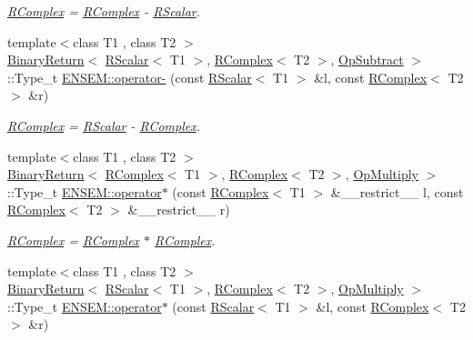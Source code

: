 \begin{DoxyCompactItemize}
\begin{DoxyCompactList}\small\item\em \mbox{\hyperlink{classENSEM_1_1RComplex}{R\+Complex}} = \mbox{\hyperlink{classENSEM_1_1RComplex}{R\+Complex}} -\/ \mbox{\hyperlink{classENSEM_1_1RScalar}{R\+Scalar}}. \end{DoxyCompactList}\item 
{\footnotesize template$<$class T1 , class T2 $>$ }\\\mbox{\hyperlink{structENSEM_1_1BinaryReturn}{Binary\+Return}}$<$ \mbox{\hyperlink{classENSEM_1_1RScalar}{R\+Scalar}}$<$ T1 $>$, \mbox{\hyperlink{classENSEM_1_1RComplex}{R\+Complex}}$<$ T2 $>$, \mbox{\hyperlink{structENSEM_1_1OpSubtract}{Op\+Subtract}} $>$\+::Type\+\_\+t \mbox{\hyperlink{group__rcomplex_ga92f922f58ca43c5692f794ecb95dc1f5}{E\+N\+S\+E\+M\+::operator-\/}} (const \mbox{\hyperlink{classENSEM_1_1RScalar}{R\+Scalar}}$<$ T1 $>$ \&l, const \mbox{\hyperlink{classENSEM_1_1RComplex}{R\+Complex}}$<$ T2 $>$ \&r)
\begin{DoxyCompactList}\small\item\em \mbox{\hyperlink{classENSEM_1_1RComplex}{R\+Complex}} = \mbox{\hyperlink{classENSEM_1_1RScalar}{R\+Scalar}} -\/ \mbox{\hyperlink{classENSEM_1_1RComplex}{R\+Complex}}. \end{DoxyCompactList}\item 
{\footnotesize template$<$class T1 , class T2 $>$ }\\\mbox{\hyperlink{structENSEM_1_1BinaryReturn}{Binary\+Return}}$<$ \mbox{\hyperlink{classENSEM_1_1RComplex}{R\+Complex}}$<$ T1 $>$, \mbox{\hyperlink{classENSEM_1_1RComplex}{R\+Complex}}$<$ T2 $>$, \mbox{\hyperlink{structENSEM_1_1OpMultiply}{Op\+Multiply}} $>$\+::Type\+\_\+t \mbox{\hyperlink{group__rcomplex_gab6d38d52433e94dc9aedbb69f2463255}{E\+N\+S\+E\+M\+::operator$\ast$}} (const \mbox{\hyperlink{classENSEM_1_1RComplex}{R\+Complex}}$<$ T1 $>$ \&\+\_\+\+\_\+restrict\+\_\+\+\_\+ l, const \mbox{\hyperlink{classENSEM_1_1RComplex}{R\+Complex}}$<$ T2 $>$ \&\+\_\+\+\_\+restrict\+\_\+\+\_\+ r)
\begin{DoxyCompactList}\small\item\em \mbox{\hyperlink{classENSEM_1_1RComplex}{R\+Complex}} = \mbox{\hyperlink{classENSEM_1_1RComplex}{R\+Complex}} $\ast$ \mbox{\hyperlink{classENSEM_1_1RComplex}{R\+Complex}}. \end{DoxyCompactList}\item 
{\footnotesize template$<$class T1 , class T2 $>$ }\\\mbox{\hyperlink{structENSEM_1_1BinaryReturn}{Binary\+Return}}$<$ \mbox{\hyperlink{classENSEM_1_1RScalar}{R\+Scalar}}$<$ T1 $>$, \mbox{\hyperlink{classENSEM_1_1RComplex}{R\+Complex}}$<$ T2 $>$, \mbox{\hyperlink{structENSEM_1_1OpMultiply}{Op\+Multiply}} $>$\+::Type\+\_\+t \mbox{\hyperlink{group__rcomplex_ga0d32e4173e14565f942b2e42ede11659}{E\+N\+S\+E\+M\+::operator$\ast$}} (const \mbox{\hyperlink{classENSEM_1_1RScalar}{R\+Scalar}}$<$ T1 $>$ \&l, const \mbox{\hyperlink{classENSEM_1_1RComplex}{R\+Complex}}$<$ T2 $>$ \&r)

\end{DoxyCompactItemize}
